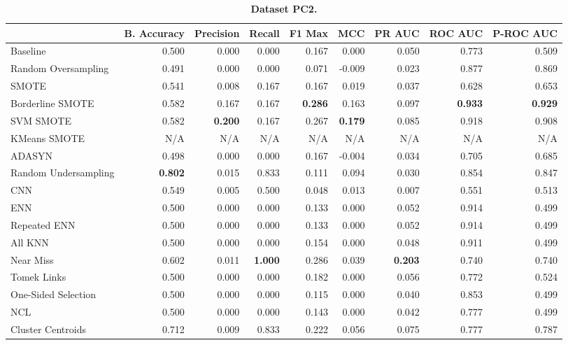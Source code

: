 \begin{table}[H]
    \centering
    \setlength\tabcolsep{2pt}
    \begin{tabularx}{\textwidth}{lRRRRRRRR}
        & B. Accuracy & Precision & Recall & F1 Max & MCC & PR AUC & ROC AUC & P-ROC AUC \\
        \midrule
        Baseline & 0.500 & 0.000 & 0.000 & 0.167 & 0.000 & 0.050 & 0.773 & 0.509 \\
        Random Oversampling & 0.491 & 0.000 & 0.000 & 0.071 & -0.009 & 0.023 & 0.877 & 0.869 \\
        SMOTE & 0.541 & 0.008 & 0.167 & 0.167 & 0.019 & 0.037 & 0.628 & 0.653 \\
        Borderline SMOTE & 0.582 & 0.167 & 0.167 & \textbf{0.286} & 0.163 & 0.097 & \textbf{0.933} & \textbf{0.929} \\
        SVM SMOTE & 0.582 & \textbf{0.200} & 0.167 & 0.267 & \textbf{0.179} & 0.085 & 0.918 & 0.908 \\
        KMeans SMOTE & N/A & N/A & N/A & N/A & N/A & N/A & N/A & N/A \\
        ADASYN & 0.498 & 0.000 & 0.000 & 0.167 & -0.004 & 0.034 & 0.705 & 0.685 \\
        Random Undersampling & \textbf{0.802} & 0.015 & 0.833 & 0.111 & 0.094 & 0.030 & 0.854 & 0.847 \\
        CNN & 0.549 & 0.005 & 0.500 & 0.048 & 0.013 & 0.007 & 0.551 & 0.513 \\
        ENN & 0.500 & 0.000 & 0.000 & 0.133 & 0.000 & 0.052 & 0.914 & 0.499 \\
        Repeated ENN & 0.500 & 0.000 & 0.000 & 0.133 & 0.000 & 0.052 & 0.914 & 0.499 \\
        All KNN & 0.500 & 0.000 & 0.000 & 0.154 & 0.000 & 0.048 & 0.911 & 0.499 \\
        Near Miss & 0.602 & 0.011 & \textbf{1.000} & 0.286 & 0.039 & \textbf{0.203} & 0.740 & 0.740 \\
        Tomek Links & 0.500 & 0.000 & 0.000 & 0.182 & 0.000 & 0.056 & 0.772 & 0.524 \\
        One-Sided Selection & 0.500 & 0.000 & 0.000 & 0.115 & 0.000 & 0.040 & 0.853 & 0.499 \\
        NCL & 0.500 & 0.000 & 0.000 & 0.143 & 0.000 & 0.042 & 0.777 & 0.499 \\
        Cluster Centroids & 0.712 & 0.009 & 0.833 & 0.222 & 0.056 & 0.075 & 0.777 & 0.787 \\
    \end{tabularx}
    \vspace{1mm}
    \caption{\textbf{Dataset PC2.}}
\end{table}
